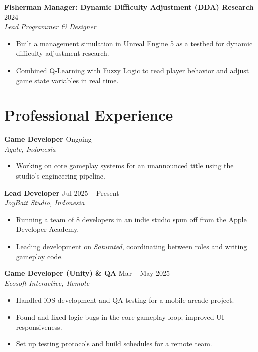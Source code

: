 \documentclass[11pt,a4paper]{article}
\begin{document}
\vspace{0.5em}
\noindent
\textbf{Fisherman Manager: Dynamic Difficulty Adjustment (DDA) Research} \hfill 2024 \\
\textit{Lead Programmer \& Designer}
\begin{itemize}
    \item Built a management simulation in Unreal Engine 5 as a testbed for dynamic difficulty adjustment research.
    \item Combined Q-Learning with Fuzzy Logic to read player behavior and adjust game state variables in real time.
\end{itemize}

\section*{Professional Experience}

\noindent
\textbf{Game Developer} \hfill Ongoing \\
\textit{Agate, Indonesia}
\begin{itemize}
    \item Working on core gameplay systems for an unannounced title using the studio's engineering pipeline.
\end{itemize}

\vspace{0.5em}
\noindent
\textbf{Lead Developer} \hfill Jul 2025 -- Present \\
\textit{JoyBait Studio, Indonesia}
\begin{itemize}
    \item Running a team of 8 developers in an indie studio spun off from the Apple Developer Academy.
    \item Leading development on \textit{Saturated}, coordinating between roles and writing gameplay code.
\end{itemize}

\vspace{0.5em}
\noindent
\textbf{Game Developer (Unity) \& QA} \hfill Mar -- May 2025 \\
\textit{Ecosoft Interactive, Remote}
\begin{itemize}
    \item Handled iOS development and QA testing for a mobile arcade project.
    \item Found and fixed logic bugs in the core gameplay loop; improved UI responsiveness.
    \item Set up testing protocols and build schedules for a remote team.
\end{itemize}
\end{document}

